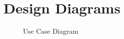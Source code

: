 \section{Design Diagrams}
\begin{figure}
	\caption{Use Case Diagram}
\label{fig:useCase}
\end{figure}
